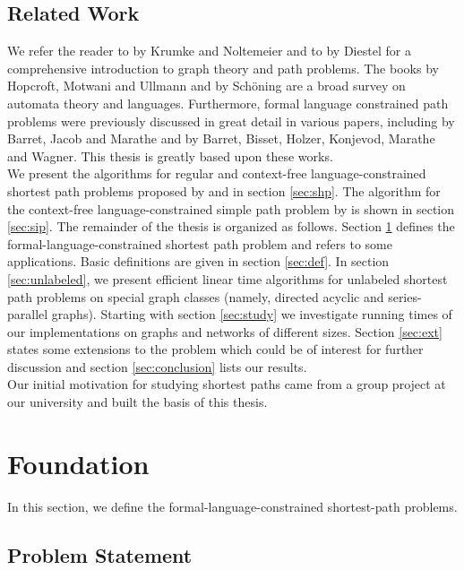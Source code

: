 \documentclass[]{article}
\numberwithin{equation}{section}
\begin{document}
\subsection{Related Work}
\label{sec:intro:rel}

We refer the reader to \cite{KN12} by Krumke and Noltemeier and to \cite{Die06} by Diestel for a comprehensive introduction to graph theory and path problems. The books \cite{HMU06} by Hopcroft, Motwani and Ullmann and \cite{Sch08} by Sch\"oning are a broad survey on automata theory and languages. Furthermore, formal language constrained path problems were previously discussed in great detail in various papers, including \cite{BJM00} by Barret, Jacob and Marathe and \cite{BB+08} by Barret, Bisset, Holzer, Konjevod, Marathe and Wagner. This thesis is greatly based upon these works.\\

We present the algorithms for regular and context-free language-constrained shortest path problems proposed by \cite{BJM00} and \cite{WWB08} in section \ref{sec:shp}. The algorithm for the context-free language-constrained simple path problem by \cite{BJM00} is shown in section \ref{sec:sip}. The remainder of the thesis is organized as follows. Section \ref{sec:found} defines the formal-language-constrained shortest path problem and refers to some applications. Basic definitions are given in section \ref{sec:def}. In section \ref{sec:unlabeled}, we present efficient linear time algorithms for unlabeled shortest path problems on special graph classes (namely, directed acyclic and series-parallel graphs). Starting with section \ref{sec:study} we investigate running times of our implementations on graphs and networks of different sizes. Section \ref{sec:ext} states some extensions to the problem which could be of interest for further discussion and section \ref{sec:conclusion} lists our results.\\

Our initial motivation for studying shortest paths came from a group project at our university and built the basis of this thesis.

\newpage

\section{Foundation}
\label{sec:found}

In this section, we define the formal-language-constrained shortest-path problems.

\subsection{Problem Statement}
\label{sec:found:problem}
\end{document}
